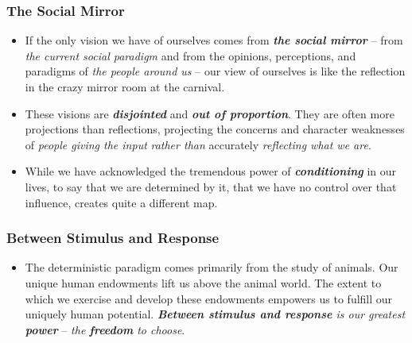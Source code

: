 \documentclass[11pt]{article}
\begin{document}
\subsubsection{The Social Mirror}
\begin{itemize}
\item If the only vision we have of ourselves comes from \emph{\textbf{the social mirror}} -- from \emph{the current social paradigm} and from the opinions, perceptions, and paradigms of \emph{the people around us} -- our view of ourselves is like the reflection in the crazy mirror room at the carnival.

\item These visions are \emph{\textbf{disjointed}} and \emph{\textbf{out of proportion}}. They are often more projections than reflections, projecting the concerns and character weaknesses of \emph{people giving the input} \emph{rather than} accurately \emph{reflecting what we are}.

\item While we have acknowledged the tremendous power of \emph{\textbf{conditioning}} in our lives, to say that we are determined by it, that we have no control over that influence, creates quite a different map.
\end{itemize}
\subsubsection{Between Stimulus and Response}
\begin{itemize}
\item The deterministic paradigm comes primarily from the study of animals. Our unique human endowments lift us above the animal world. The extent to which we exercise and develop these endowments empowers us to fulfill our uniquely human potential. \emph{\textbf{Between stimulus and response} is our greatest \textbf{power}} -- \emph{the \textbf{freedom} to choose}.
\end{itemize}
\end{document}
